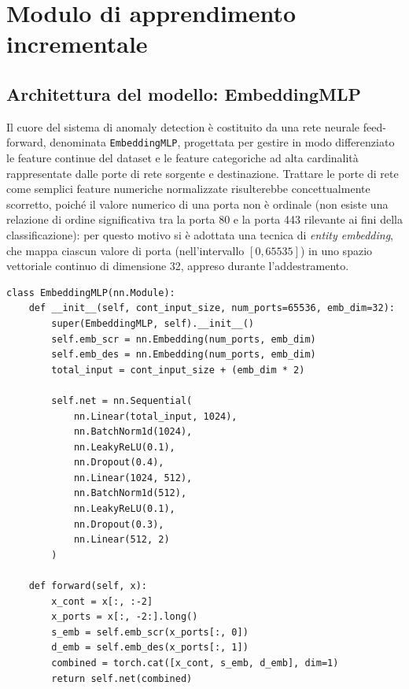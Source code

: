 \documentclass[12pt,a4paper]{report}
\begin{document}
\section{Modulo di apprendimento incrementale}

\subsection{Architettura del modello: EmbeddingMLP}

Il cuore del sistema di anomaly detection è costituito da una rete neurale feed-forward, denominata \texttt{EmbeddingMLP}, progettata per gestire in modo differenziato le feature continue del dataset e le feature categoriche ad alta cardinalità rappresentate dalle porte di rete sorgente e destinazione. Trattare le porte di rete come semplici feature numeriche normalizzate risulterebbe concettualmente scorretto, poiché il valore numerico di una porta non è ordinale (non esiste una relazione di ordine significativa tra la porta 80 e la porta 443 rilevante ai fini della classificazione): per questo motivo si è adottata una tecnica di \emph{entity embedding}, che mappa ciascun valore di porta (nell'intervallo $[0, 65535]$) in uno spazio vettoriale continuo di dimensione 32, appreso durante l'addestramento.

\begin{lstlisting}[caption={Architettura della rete \texttt{EmbeddingMLP} (\texttt{validazioneACDBconEmbedding.py})}]
class EmbeddingMLP(nn.Module):
    def __init__(self, cont_input_size, num_ports=65536, emb_dim=32):
        super(EmbeddingMLP, self).__init__()
        self.emb_scr = nn.Embedding(num_ports, emb_dim)
        self.emb_des = nn.Embedding(num_ports, emb_dim)
        total_input = cont_input_size + (emb_dim * 2)

        self.net = nn.Sequential(
            nn.Linear(total_input, 1024),
            nn.BatchNorm1d(1024),
            nn.LeakyReLU(0.1),
            nn.Dropout(0.4),
            nn.Linear(1024, 512),
            nn.BatchNorm1d(512),
            nn.LeakyReLU(0.1),
            nn.Dropout(0.3),
            nn.Linear(512, 2)
        )

    def forward(self, x):
        x_cont = x[:, :-2]
        x_ports = x[:, -2:].long()
        s_emb = self.emb_scr(x_ports[:, 0])
        d_emb = self.emb_des(x_ports[:, 1])
        combined = torch.cat([x_cont, s_emb, d_emb], dim=1)
        return self.net(combined)
\end{lstlisting}
\end{document}
